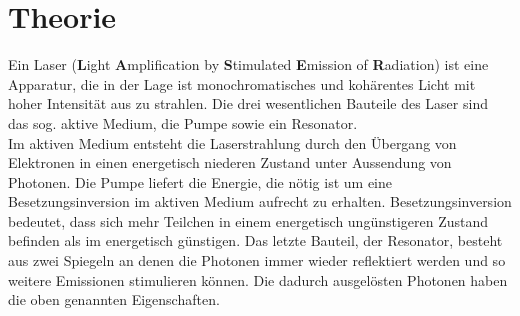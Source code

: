 
\section{Theorie}
\label{sec:Theorie}
Ein Laser (\textbf{L}ight \textbf{A}mplification by \textbf{S}timulated \textbf{E}mission of \textbf{R}adiation) ist eine Apparatur, die in der Lage ist
monochromatisches und kohärentes Licht mit hoher Intensität aus zu strahlen. Die drei wesentlichen Bauteile des Laser sind das sog. aktive Medium, die Pumpe sowie ein Resonator. \\
Im aktiven Medium entsteht die Laserstrahlung durch den Übergang von Elektronen in einen energetisch niederen Zustand unter Aussendung von Photonen.
Die Pumpe liefert die Energie, die nötig ist um eine Besetzungsinversion im aktiven Medium aufrecht zu erhalten. Besetzungsinversion bedeutet, dass sich mehr Teilchen in einem
energetisch ungünstigeren Zustand befinden als im energetisch günstigen.
Das letzte Bauteil, der Resonator, besteht aus zwei Spiegeln an denen die Photonen immer wieder reflektiert werden und so weitere Emissionen stimulieren können.
Die dadurch ausgelösten Photonen haben die oben genannten Eigenschaften.
